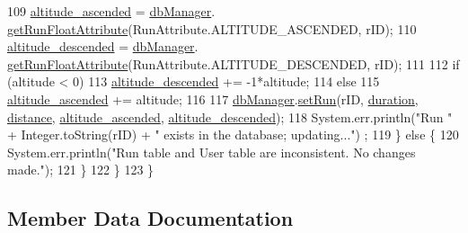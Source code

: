\begin{DoxyCode}
109                 \mbox{\hyperlink{classcom_1_1activitytracker_1_1_run_a247fe29ef5dceeb25750fc7c2701f5c8}{altitude\_ascended}} = \mbox{\hyperlink{classcom_1_1activitytracker_1_1_run_ab90e32eda9f4c671ae3575f971edca6b}{dbManager}}.
      \mbox{\hyperlink{classcom_1_1activitytracker_1_1_d_b_manager_a666452f1e5862f90c06b0beb9a9fcfdd}{getRunFloatAttribute}}(RunAttribute.ALTITUDE\_ASCENDED, rID);
110                 \mbox{\hyperlink{classcom_1_1activitytracker_1_1_run_a26cd078680ee374482ce848b90308dda}{altitude\_descended}} = \mbox{\hyperlink{classcom_1_1activitytracker_1_1_run_ab90e32eda9f4c671ae3575f971edca6b}{dbManager}}.
      \mbox{\hyperlink{classcom_1_1activitytracker_1_1_d_b_manager_a666452f1e5862f90c06b0beb9a9fcfdd}{getRunFloatAttribute}}(RunAttribute.ALTITUDE\_DESCENDED, rID);
111 
112                 \textcolor{keywordflow}{if} (altitude < 0)
113                     \mbox{\hyperlink{classcom_1_1activitytracker_1_1_run_a26cd078680ee374482ce848b90308dda}{altitude\_descended}} += -1*altitude;
114                 \textcolor{keywordflow}{else}
115                     \mbox{\hyperlink{classcom_1_1activitytracker_1_1_run_a247fe29ef5dceeb25750fc7c2701f5c8}{altitude\_ascended}} += altitude;
116 
117                 \mbox{\hyperlink{classcom_1_1activitytracker_1_1_run_ab90e32eda9f4c671ae3575f971edca6b}{dbManager}}.\mbox{\hyperlink{classcom_1_1activitytracker_1_1_d_b_manager_a72282377a552ce4ce371abff02e312f2}{setRun}}(rID, \mbox{\hyperlink{classcom_1_1activitytracker_1_1_run_a5e38d293d29d4b65c9290ff4bee82e03}{duration}}, \mbox{\hyperlink{classcom_1_1activitytracker_1_1_run_a7b4ca8c4ecea4da1653f03b8c8fc16a8}{distance}}, 
      \mbox{\hyperlink{classcom_1_1activitytracker_1_1_run_a247fe29ef5dceeb25750fc7c2701f5c8}{altitude\_ascended}}, \mbox{\hyperlink{classcom_1_1activitytracker_1_1_run_a26cd078680ee374482ce848b90308dda}{altitude\_descended}});
118                 System.err.println(\textcolor{stringliteral}{"Run "} + Integer.toString(rID) + \textcolor{stringliteral}{" exists in the database; updating..."})
      ;
119             \} \textcolor{keywordflow}{else} \{
120                 System.err.println(\textcolor{stringliteral}{"Run table and User table are inconsistent. No changes made."});
121             \}
122         \}
123     \}
\end{DoxyCode}


\subsection{Member Data Documentation}
\mbox{\label{classcom_1_1activitytracker_1_1_run_a247fe29ef5dceeb25750fc7c2701f5c8}} 
